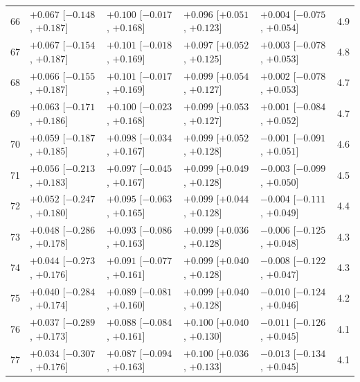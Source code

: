 \begin{longtable}{rllllr}
66 & $+0.067$ {\scriptsize [$-0.148$, $+0.187$]} & $+0.100$ {\scriptsize [$-0.017$, $+0.168$]} & $+0.096$ {\scriptsize [$+0.051$, $+0.123$]} & $+0.004$ {\scriptsize [$-0.075$, $+0.054$]} & 4.9 \\
67 & $+0.067$ {\scriptsize [$-0.154$, $+0.187$]} & $+0.101$ {\scriptsize [$-0.018$, $+0.169$]} & $+0.097$ {\scriptsize [$+0.052$, $+0.125$]} & $+0.003$ {\scriptsize [$-0.078$, $+0.053$]} & 4.8 \\
68 & $+0.066$ {\scriptsize [$-0.155$, $+0.187$]} & $+0.101$ {\scriptsize [$-0.017$, $+0.169$]} & $+0.099$ {\scriptsize [$+0.054$, $+0.127$]} & $+0.002$ {\scriptsize [$-0.078$, $+0.053$]} & 4.7 \\
69 & $+0.063$ {\scriptsize [$-0.171$, $+0.186$]} & $+0.100$ {\scriptsize [$-0.023$, $+0.168$]} & $+0.099$ {\scriptsize [$+0.053$, $+0.127$]} & $+0.001$ {\scriptsize [$-0.084$, $+0.052$]} & 4.7 \\
70 & $+0.059$ {\scriptsize [$-0.187$, $+0.185$]} & $+0.098$ {\scriptsize [$-0.034$, $+0.167$]} & $+0.099$ {\scriptsize [$+0.052$, $+0.128$]} & $-0.001$ {\scriptsize [$-0.091$, $+0.051$]} & 4.6 \\
71 & $+0.056$ {\scriptsize [$-0.213$, $+0.183$]} & $+0.097$ {\scriptsize [$-0.045$, $+0.167$]} & $+0.099$ {\scriptsize [$+0.049$, $+0.128$]} & $-0.003$ {\scriptsize [$-0.099$, $+0.050$]} & 4.5 \\
72 & $+0.052$ {\scriptsize [$-0.247$, $+0.180$]} & $+0.095$ {\scriptsize [$-0.063$, $+0.165$]} & $+0.099$ {\scriptsize [$+0.044$, $+0.128$]} & $-0.004$ {\scriptsize [$-0.111$, $+0.049$]} & 4.4 \\
73 & $+0.048$ {\scriptsize [$-0.286$, $+0.178$]} & $+0.093$ {\scriptsize [$-0.086$, $+0.163$]} & $+0.099$ {\scriptsize [$+0.036$, $+0.128$]} & $-0.006$ {\scriptsize [$-0.125$, $+0.048$]} & 4.3 \\
74 & $+0.044$ {\scriptsize [$-0.273$, $+0.176$]} & $+0.091$ {\scriptsize [$-0.077$, $+0.161$]} & $+0.099$ {\scriptsize [$+0.040$, $+0.128$]} & $-0.008$ {\scriptsize [$-0.122$, $+0.047$]} & 4.3 \\
75 & $+0.040$ {\scriptsize [$-0.284$, $+0.174$]} & $+0.089$ {\scriptsize [$-0.081$, $+0.160$]} & $+0.099$ {\scriptsize [$+0.040$, $+0.128$]} & $-0.010$ {\scriptsize [$-0.124$, $+0.046$]} & 4.2 \\
76 & $+0.037$ {\scriptsize [$-0.289$, $+0.173$]} & $+0.088$ {\scriptsize [$-0.084$, $+0.161$]} & $+0.100$ {\scriptsize [$+0.040$, $+0.130$]} & $-0.011$ {\scriptsize [$-0.126$, $+0.045$]} & 4.1 \\
77 & $+0.034$ {\scriptsize [$-0.307$, $+0.176$]} & $+0.087$ {\scriptsize [$-0.094$, $+0.163$]} & $+0.100$ {\scriptsize [$+0.036$, $+0.133$]} & $-0.013$ {\scriptsize [$-0.134$, $+0.045$]} & 4.1 \\

\end{longtable}
